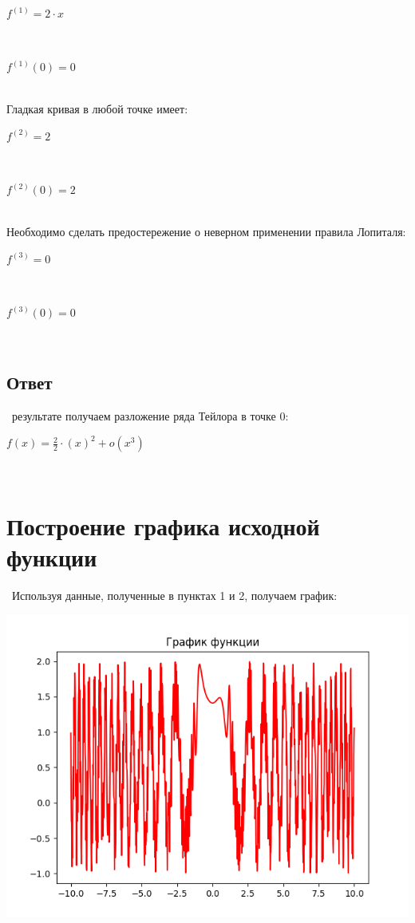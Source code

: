 \documentclass[a4paper,14pt]{extarticle}
\begin{document}
\begin{center}$f^{\left(1\right)} = 2 \cdot x$\end{center}\ 
\begin{center}$f^{\left(1\right)}\left(0\right) = 0
$\end{center}\ \newline \\ 
Гладкая кривая в любой точке имеет: \\ 

\begin{center}$f^{\left(2\right)} = 2$\end{center}\ 
\begin{center}$f^{\left(2\right)}\left(0\right) = 2
$\end{center}\ \newline \\ 
Необходимо сделать предостережение о неверном применении правила Лопиталя: \\ 

\begin{center}$f^{\left(3\right)} = 0$\end{center}\ 
\begin{center}$f^{\left(3\right)}\left(0\right) = 0
$\end{center}\ \newline \\ 
\subsection{Ответ}\ \newlineВ результате получаем разложение ряда Тейлора в точке 0:\begin{center}$f\left(x\right) = \frac{2}{2} \cdot{(x)^{2}} + o(x^{3})$ \end{center}\ 


\section{Построение графика исходной функции}\ Используя данные, полученные в пунктах 1 и 2, получаем график:
\begin{center} \includegraphics[scale=0.8]{plot.png} \end{center}
\end{document}
